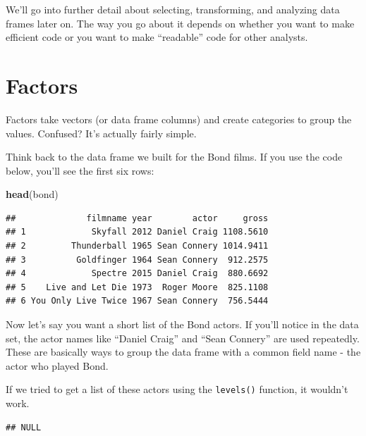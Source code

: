 \documentclass[
]{book}
\newenvironment{Shaded}{\begin{snugshade}}{\end{snugshade}}
\newcommand{\KeywordTok}[1]{\textcolor[rgb]{0.13,0.29,0.53}{\textbf{#1}}}
\newcommand{\NormalTok}[1]{#1}
\newcommand{\OperatorTok}[1]{\textcolor[rgb]{0.81,0.36,0.00}{\textbf{#1}}}
\begin{document}
We'll go into further detail about selecting, transforming, and analyzing data frames later on. The way you go about it depends on whether you want to make efficient code or you want to make ``readable'' code for other analysts.

\hypertarget{factors}{%
\section{Factors}\label{factors}}

Factors take vectors (or data frame columns) and create categories to group the values. Confused? It's actually fairly simple.

Think back to the data frame we built for the Bond films. If you use the code below, you'll see the first six rows:

\begin{Shaded}
\begin{Highlighting}[]
\KeywordTok{head}\NormalTok{(bond)}
\end{Highlighting}
\end{Shaded}

\begin{verbatim}
##              filmname year        actor     gross
## 1             Skyfall 2012 Daniel Craig 1108.5610
## 2         Thunderball 1965 Sean Connery 1014.9411
## 3          Goldfinger 1964 Sean Connery  912.2575
## 4             Spectre 2015 Daniel Craig  880.6692
## 5    Live and Let Die 1973  Roger Moore  825.1108
## 6 You Only Live Twice 1967 Sean Connery  756.5444
\end{verbatim}

Now let's say you want a short list of the Bond actors. If you'll notice in the data set, the actor names like ``Daniel Craig'' and ``Sean Connery'' are used repeatedly. These are basically ways to group the data frame with a common field name - the actor who played Bond.

If we tried to get a list of these actors using the \texttt{levels()} function, it wouldn't work.

\begin{Shaded}
\end{Shaded}

\begin{verbatim}
## NULL
\end{verbatim}
\end{document}
